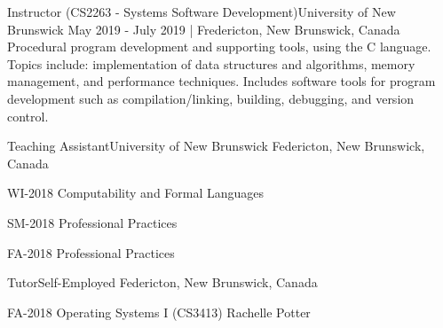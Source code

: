 \documentclass[english,letterpaper,12pt]{deedy-resume-openfont}
\begin{document}





    \employement%
        {Instructor (CS2263 - Systems Software Development)}{University of New Brunswick}
        {May 2019 - July 2019 | Fredericton, New Brunswick, Canada}{%
        Procedural program development and supporting tools, using the C language. 
        Topics include: implementation of data structures and algorithms, memory management, and performance techniques. 
        Includes software tools for program development such as compilation/linking, building, debugging, and version control.
        }

    \employement%
        {Teaching Assistant}{University of New Brunswick}
        {Federicton, New Brunswick, Canada}{%
        \begin{tightemize}
        \item WI-2018 Computability and Formal Languages
        \item SM-2018 Professional Practices
        \item FA-2018 Professional Practices
        \end{tightemize}
        }

    \employement%
        {Tutor}{Self-Employed}
        {Federicton, New Brunswick, Canada}{%
        \begin{tightemize}
        \item FA-2018 Operating Systems I (CS3413) Rachelle Potter
        \end{tightemize}
        }
\end{document}

